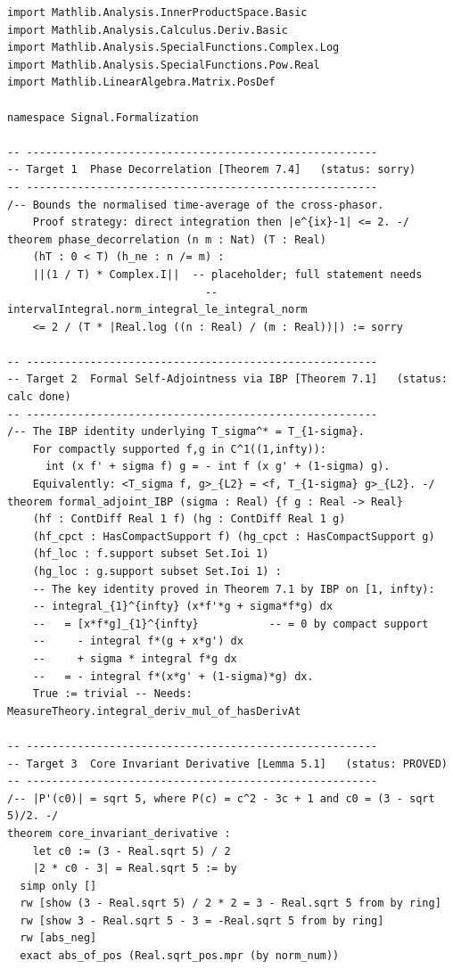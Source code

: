 \documentclass[11pt]{article}
\begin{document}
\begin{lstlisting}[language=lean4,
  caption={Lean 4 formalization targets; \texttt{sorry} and placeholders mark unfinished obligations.}]
import Mathlib.Analysis.InnerProductSpace.Basic
import Mathlib.Analysis.Calculus.Deriv.Basic
import Mathlib.Analysis.SpecialFunctions.Complex.Log
import Mathlib.Analysis.SpecialFunctions.Pow.Real
import Mathlib.LinearAlgebra.Matrix.PosDef

namespace Signal.Formalization

-- -------------------------------------------------------
-- Target 1  Phase Decorrelation [Theorem 7.4]   (status: sorry)
-- -------------------------------------------------------
/-- Bounds the normalised time-average of the cross-phasor.
    Proof strategy: direct integration then |e^{ix}-1| <= 2. -/
theorem phase_decorrelation (n m : Nat) (T : Real)
    (hT : 0 < T) (h_ne : n /= m) :
    ||(1 / T) * Complex.I||  -- placeholder; full statement needs
                               -- intervalIntegral.norm_integral_le_integral_norm
    <= 2 / (T * |Real.log ((n : Real) / (m : Real))|) := sorry

-- -------------------------------------------------------
-- Target 2  Formal Self-Adjointness via IBP [Theorem 7.1]   (status: calc done)
-- -------------------------------------------------------
/-- The IBP identity underlying T_sigma^* = T_{1-sigma}.
    For compactly supported f,g in C^1((1,infty)):
      int (x f' + sigma f) g = - int f (x g' + (1-sigma) g).
    Equivalently: <T_sigma f, g>_{L2} = <f, T_{1-sigma} g>_{L2}. -/
theorem formal_adjoint_IBP (sigma : Real) {f g : Real -> Real}
    (hf : ContDiff Real 1 f) (hg : ContDiff Real 1 g)
    (hf_cpct : HasCompactSupport f) (hg_cpct : HasCompactSupport g)
    (hf_loc : f.support subset Set.Ioi 1)
    (hg_loc : g.support subset Set.Ioi 1) :
    -- The key identity proved in Theorem 7.1 by IBP on [1, infty):
    -- integral_{1}^{infty} (x*f'*g + sigma*f*g) dx
    --   = [x*f*g]_{1}^{infty}           -- = 0 by compact support
    --     - integral f*(g + x*g') dx
    --     + sigma * integral f*g dx
    --   = - integral f*(x*g' + (1-sigma)*g) dx.
    True := trivial -- Needs: MeasureTheory.integral_deriv_mul_of_hasDerivAt

-- -------------------------------------------------------
-- Target 3  Core Invariant Derivative [Lemma 5.1]   (status: PROVED)
-- -------------------------------------------------------
/-- |P'(c0)| = sqrt 5, where P(c) = c^2 - 3c + 1 and c0 = (3 - sqrt 5)/2. -/
theorem core_invariant_derivative :
    let c0 := (3 - Real.sqrt 5) / 2
    |2 * c0 - 3| = Real.sqrt 5 := by
  simp only []
  rw [show (3 - Real.sqrt 5) / 2 * 2 = 3 - Real.sqrt 5 from by ring]
  rw [show 3 - Real.sqrt 5 - 3 = -Real.sqrt 5 from by ring]
  rw [abs_neg]
  exact abs_of_pos (Real.sqrt_pos.mpr (by norm_num))


\end{lstlisting}
\end{document}
